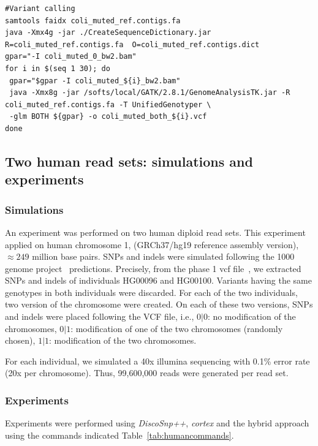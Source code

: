 \documentclass{bmcart}
\newcommand{\discopp}{{\it DiscoSnp++}\xspace}
\newcommand{\co}{{\it cortex}\xspace}
\begin{document}
\begin{table}[ht]
\begin{verbatim}
#Variant calling
samtools faidx coli_muted_ref.contigs.fa
java -Xmx4g -jar ./CreateSequenceDictionary.jar  R=coli_muted_ref.contigs.fa  O=coli_muted_ref.contigs.dict
gpar="-I coli_muted_0_bw2.bam"
for i in $(seq 1 30); do
 gpar="$gpar -I coli_muted_${i}_bw2.bam"
 java -Xmx8g -jar /softs/local/GATK/2.8.1/GenomeAnalysisTK.jar -R coli_muted_ref.contigs.fa -T UnifiedGenotyper \
 -glm BOTH ${gpar} -o coli_muted_both_${i}.vcf
done

	\end{verbatim}	\normalsize
	\caption{Commands used for calling SNPs and indels from 2 to 30 E. Coli read sets ({coli\_muted\_n\_30\_genome\_$i$\_reads.fasta} for $i$ in $[1,30]$) with \discopp, \co or the hybrid approach. \label{tab:colicommands}}
\end{table}




\subsection*{Two human read sets: simulations and experiments}
\subsubsection*{Simulations}
An experiment was performed on two human diploid read sets. This experiment applied on human chromosome 1, (GRCh37/hg19 reference assembly version), $\approx249$ million base pairs. SNPs and indels were simulated following the 1000 genome project~\cite{Altshuler2012} predictions. Precisely, from the phase 1 vcf file~\cite{vcf}, we extracted SNPs and indels of individuals HG00096 and HG00100. Variants having the same genotypes in both individuals were discarded. For each of the two individuals, two version of the chromosome were created. On each of these two versions, SNPs and indels were placed following the VCF file, i.e., $0|0$: no modification of the chromosomes, $0|1$: modification of one of the two chromosomes (randomly chosen), $1|1$: modification of the two chromosomes. 

For each individual, we simulated a 40x illumina sequencing with 0.1\% error rate (20x per chromosome). Thus, 99,600,000 reads were generated per read set. 

\subsubsection*{Experiments}
Experiments were performed using \discopp, \co and the hybrid approach using the commands indicated Table~\ref{tab:humancommands}.
\end{document}
